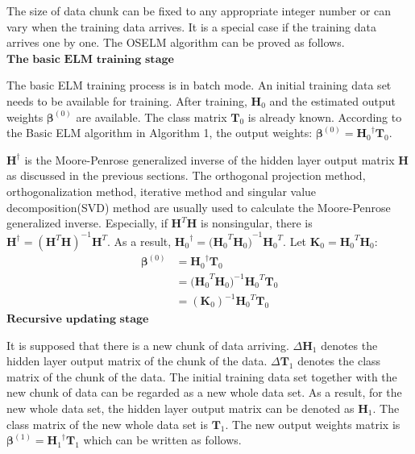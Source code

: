 \documentclass[a4paper, 14pt]{extarticle}
\begin{document}
The size of data chunk can be fixed to any appropriate integer number or can vary when the training data arrives. It is a special case if the training data arrives one by one. The OSELM algorithm can be proved as follows\cite{liang2006fast}.\newline\newline
$\textbf{The basic ELM training stage}$\newline
\par The basic ELM training process is in batch mode. An initial training data set needs to be available for training. After training, \(\mathbf{H}_0\) and the estimated output weights \(\mathbf{\beta}^{(0)}\) are available. The class matrix \(\mathbf{T}_0\) is already known. According to the Basic ELM algorithm in Algorithm 1, the output weights: \(\mathbf{\beta}^{(0)} = {\mathbf{H}_0}^\dagger\mathbf{T}_0\).
\par \(\mathbf{H}^\dagger\) is the Moore-Penrose generalized inverse of the hidden layer output matrix \(\mathbf{H}\) as discussed in the previous sections. The orthogonal projection method, orthogonalization method, iterative method and singular value decomposition(SVD) method are usually used to calculate the Moore-Penrose generalized inverse. Especially, if \(\mathbf{H}^T\mathbf{H}\) is nonsingular, there is \(\mathbf{H}^\dagger={(\mathbf{H}^T\mathbf{H})}^{-1}\mathbf{H}^T\). As a result, \({\mathbf{H}_0}^\dagger={{(\mathbf{H}_0}^T\mathbf{H}_0)}^{-1}{\mathbf{H}_0}^T\). Let \(\mathbf{K}_0={\mathbf{H}_0}^T\mathbf{H}_0\): 
\begin{equation}
\begin{split}
    \mathbf{\beta}^{(0)} &= {\mathbf{H}_0}^\dagger\mathbf{T}_0 
    \\&= {(\mathbf{H}_0}^T\mathbf{H}_0)^{-1}{\mathbf{H}_0}^T\mathbf{T}_0\\&= (\mathbf{K}_0)^{-1}{\mathbf{H}_0}^T\mathbf{T}_0
\end{split}
\end{equation}
\newline
$\textbf{Recursive updating stage}$\newline
\par It is supposed that there is a new chunk of data arriving. \(\Delta\mathbf{H}_1\) denotes the hidden layer output matrix of the chunk of the data. \(\Delta\mathbf{T}_1\) denotes the class matrix of the chunk of the data. The initial training data set together with the new chunk of data can be regarded as a new whole data set. As a result, for the new whole data set, the hidden layer output matrix can be denoted as \(\mathbf{H}_1\). The class matrix of the new whole data set is \(\mathbf{T}_1\). The new output weights matrix is \(\mathbf{\beta}^{(1)}={\mathbf{H}_1}^\dagger\mathbf{T}_1\) which can be written as follows. 
\end{document}
